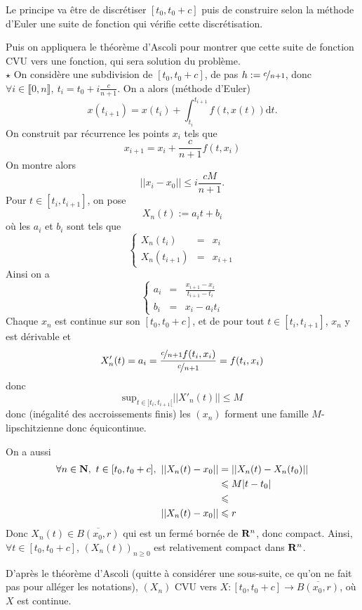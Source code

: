 \documentclass[a4paper,11pt, twoside]{article}
\begin{document}
\begin{Proof}
  Le principe va être de discrétiser $[t_0,t_0+c]$ puis de construire selon la méthode d'Euler une suite de fonction qui vérifie cette discrétisation.

  Puis on appliquera le théorème d'Ascoli pour montrer que cette suite de fonction CVU vers une fonction, qui sera solution du problème.\\

  $\star$ On considère une subdivision de $[t_0,t_0+c]$, de pas $h:=\nicefrac{c}{n+1}$, donc $\forall i\in\llbracket 0,n\rrbracket,\ t_i=t_0+i\frac{c}{n+1}$. On a alors (méthode d'Euler)
  $$x(t_{i+1})=x(t_i)+\int_{t_i}^{t_{i+1}}f(t,x(t))\mathrm dt.$$
  On construit par récurrence les points $x_i$ tels que 
  $$x_{i+1}=x_i+\frac{c}{n+1}f(t,x_i)$$
  On montre alors 
  $$||x_i-x_0||\leqslant i\frac{cM}{n+1}.$$
  Pour $t\in[t_i,t_{i+1}]$, on pose 
  $$X_n(t):=a_it+b_i$$
  où les $a_i$ et $b_i$ sont tels que 
  $$\left\{\begin{array}{ccl}
    X_n(t_i)&=&x_i\\
    X_n(t_{i+1})&=&x_{i+1}
  \end{array}\right.$$
  Ainsi on a 
  $$\left\{\begin{array}{ccl}
    \displaystyle a_i&=&\frac{x_{i+1}-x_i}{t_{i+1}-t_i}\\
    b_i&=&x_i-a_i t_i
  \end{array}\right.$$
  Chaque $x_n$ est continue sur son $[t_0,t_0+c]$, et de pour tout $t\in [t_i,t_{i+1}]$, $x_n$ y est dérivable et 
  $$X'_n(t)=a_i=\frac{\nicefrac{c}{n+1}f(t_i,x_i)}{\nicefrac{c}{n+1}}=f(t_i,x_i)$$
  donc 
  $$\mathrm{sup}_{t\in]t_i,t_{i+1}[}||X'_n(t)||\leqslant M$$
  donc (inégalité des accroissements finis) les $(x_n)$ forment une famille $M$-lipschitzienne donc équicontinue.

  On a aussi
  \begin{align*}
    \forall n\in\N,\ t\in [t_0,t_0+c],\ ||X_n(t)-x_0||&=||X_n(t)-X_n(t_0)||\\
    &\leqslant M|t-t_0|\\
    &\leqslant \\
    ||X_n(t)-x_0||&\leqslant r\\
  \end{align*}
  Donc $X_n(t)\in\overline{B(x_0,r)}$ qui est un fermé bornée de $\mathbf R^n$, donc compact. Ainsi, $\forall t\in [t_0,t_0+c]$, $\left(X_n(t)\right)_{n\geqslant 0}$ est relativement compact dans $\mathbf R^n$.

  D'après le théorème d'Ascoli (quitte à considérer une sous-suite, ce qu'on ne fait pas pour alléger les notations), $(X_n)$ CVU vers $X:[t_0,t_0+c]\longrightarrow\overline{B(x_0,r)}$, où $X$ est continue.


\end{Proof}
\end{document}
